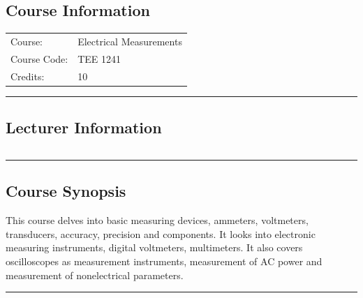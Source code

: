 
\subsection*{Course Information}
\vspace{0ex}%
\noindent\parbox{0.5\textwidth}{%
    \noindent\begin{tabular}{@{}ll}
                 \textsf{Course:}          & Electrical Measurements \\
                 \textsf{Course Code:}         & 	TEE 1241    \\
                 \textsf{Credits:}    & 	10
    \end{tabular}}
\vspace{2ex}\hrule\vspace{2ex}

\subsection*{Lecturer Information}
\noindent\parbox{0.5\textwidth}{%
    \noindent\begin{tabular}{@{}ll}
                 
    \end{tabular}}
\vspace{2ex}\hrule\vspace{2ex}


\subsection*{Course Synopsis}
This course delves into basic measuring devices, ammeters, voltmeters, transducers, accuracy, precision and components.
It looks into electronic measuring instruments, digital voltmeters, multimeters.
It also covers oscilloscopes as measurement instruments, measurement of AC power and measurement of nonelectrical parameters.
\vspace{2ex} \hrule\vspace{2ex}
